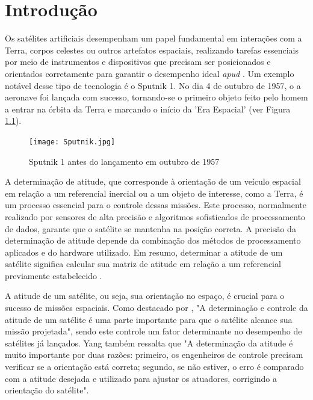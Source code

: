 \documentclass[
	12pt,				%
	openright,			%
	oneside,			%
	a4paper,			%
	english,			%
	brazil				%
	]{abntex2}
\begin{document}
\textual


\chapter[Introdução]{Introdução}



Os satélites artificiais desempenham um papel fundamental em interações com a Terra, corpos celestes ou outros artefatos espaciais, realizando tarefas essenciais por meio de instrumentos e dispositivos que precisam ser posicionados e orientados corretamente para garantir o desempenho ideal \cite{shuster1993} \textit{apud} \cite{ferreira2008}. Um exemplo notável desse tipo de tecnologia é o Sputnik 1. No dia 4 de outubro de 1957, o a aeronave foi lançada com sucesso, tornando-se o primeiro objeto feito pelo homem a entrar na órbita da Terra e marcando o início da 'Era Espacial' (ver Figura \ref{fig:sputnik}). 

\begin{figure}[h]
	\centering
	\texttt{[image: Sputnik.jpg]} %
	\caption[Sputnik 1 antes do lançamento em outubro de 1957]{Sputnik 1 antes do lançamento em outubro de 1957}
	\label{fig:sputnik}
\end{figure}

A determinação de atitude, que corresponde à orientação de um veículo espacial em relação a um referencial inercial ou a um objeto de interesse, como a Terra, é um processo essencial para o controle dessas missões. Este processo, normalmente realizado por sensores de alta precisão e algoritmos sofisticados de processamento de dados, garante que o satélite se mantenha na posição correta. A precisão da determinação de atitude depende da combinação dos métodos de processamento aplicados e do hardware utilizado. Em resumo, determinar a atitude de um satélite significa calcular sua matriz de atitude em relação a um referencial previamente estabelecido \cite{Wertz2012}.

A atitude de um satélite, ou seja, sua orientação no espaço, é crucial para o sucesso de missões espaciais. Como destacado por \cite{YANG2012198}, "A determinação e controle da atitude de um satélite é uma parte importante para que o satélite alcance sua missão projetada", sendo este controle um fator determinante no desempenho de satélites já lançados. Yang também ressalta que "A determinação da atitude é muito importante por duas razões: primeiro, os engenheiros de controle precisam verificar se a orientação está correta; segundo, se não estiver, o erro é comparado com a atitude desejada e utilizado para ajustar os atuadores, corrigindo a orientação do satélite".
\end{document}
